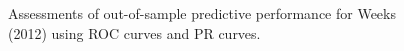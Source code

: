 \begin{figure}
	\centering   
	\caption{Assessments of out-of-sample predictive performance for Weeks (2012) using ROC curves and PR curves.}
\end{figure}
\FloatBarrier